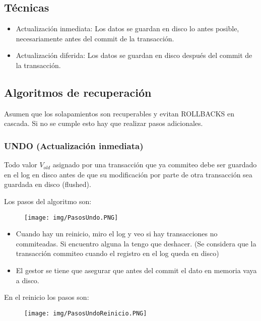 \subsection*{Técnicas}

\begin{itemize}
\item Actualización inmediata: Los datos se guardan en disco lo antes posible, necesariamente antes del commit de la transacción.
\item Actualización diferida: Los datos se guardan en disco después del commit de la transacción.
\end{itemize}

\newpage
\subsection*{Algoritmos de recuperación}
Asumen que los solapamientos son recuperables y evitan ROLLBACKS en cascada. Si no se cumple esto hay que realizar pasos adicionales.

\subsubsection*{UNDO (Actualización inmediata)}
Todo valor $V_{old}$ asignado por una transacción que ya commiteo debe ser guardado en el log en disco antes de que su modificación por parte de otra transacción sea guardada en disco (flushed).

\medskip
Los pasos del algoritmo son:

\begin{figure}[!htb]
    \centering
    \texttt{[image: img/PasosUndo.PNG]}
\end{figure}

\begin{itemize}
\item Cuando hay un reinicio, miro el log y veo si hay transacciones no commiteadas. Si encuentro alguna la tengo que deshacer. (Se considera que la transacción commiteo cuando el registro en el log queda en disco)
\item El gestor se tiene que asegurar que antes del commit el dato en memoria vaya a disco.
\end{itemize}

\medskip
En el reinicio los pasos son:

\begin{figure}[!htb]
    \centering
    \texttt{[image: img/PasosUndoReinicio.PNG]}
\end{figure}


